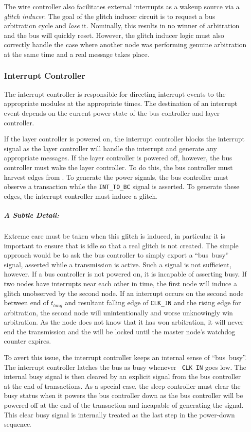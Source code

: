 The wire controller also facilitates external interrupts as a wakeup source
via a {\em glitch inducer}. The goal of the glitch inducer circuit is to
request a bus arbitration cycle and {\em lose} it. Nominally, this results in
no winner of arbitration and the bus will quickly reset. However, the glitch
inducer logic must also correctly handle the case where another node was
performing genuine arbitration at the same time and a real message takes
place.

\subsubsection{Interrupt Controller}
The interrupt controller is responsible for directing interrupt events to the
appropriate modules at the appropriate times. The destination of an interrupt
event depends on the current power state of the bus controller and layer
controller.

If the layer controller is powered on, the interrupt controller blocks the
interrupt signal as the layer controller will handle the interrupt and
generate any appropriate messages. If the layer controller is powered off,
however, the bus controller must wake the layer controller. To do this, the
bus controller must harvest edges from \bus. To generate the power signals,
the bus controller must observe a transaction while the {\tt INT\_TO\_BC}
signal is asserted. To generate these edges, the interrupt controller must
induce a glitch.

\subparagraph{A Subtle Detail:}
Extreme care must be taken when this glitch is induced, in particular it is
important to ensure that \bus is idle so that a real glitch is not created.
The simple approach would be to ask the bus controller to simply export a
``bus~busy'' signal, asserted while a transmission is active. Such a signal
is not sufficient, however. If a bus controller is not powered on, it is
incapable of asserting busy. If two nodes have interrupts near each other in
time, the first node will induce a glitch unobserved by the second node. If
an interrupt occurs on the second node between end of $t_{long}$ and resultant
falling edge of {\tt CLK\_IN} and the rising edge for arbitration, the second
node will unintentionally and worse unknowingly win arbitration. As the node
does not know that it has won arbitration, it will never end the transmission
and the \bus will be locked until the master node's watchdog counter expires.

To avert this issue, the interrupt controller keeps an internal sense of
``bus~busy''.  The interrupt controller latches the bus as busy whenever {\tt
CLK\_IN} goes low. The internal busy signal is then cleared by an explicit
signal from the bus controller at the end of \bus transactions. As a special
case, the sleep controller must clear the busy status when it powers the bus
controller down as the bus controller will be powered off at the end of the
transaction and incapable of generating the signal. This clear busy signal is
internally treated as the last step in the power-down sequence.

